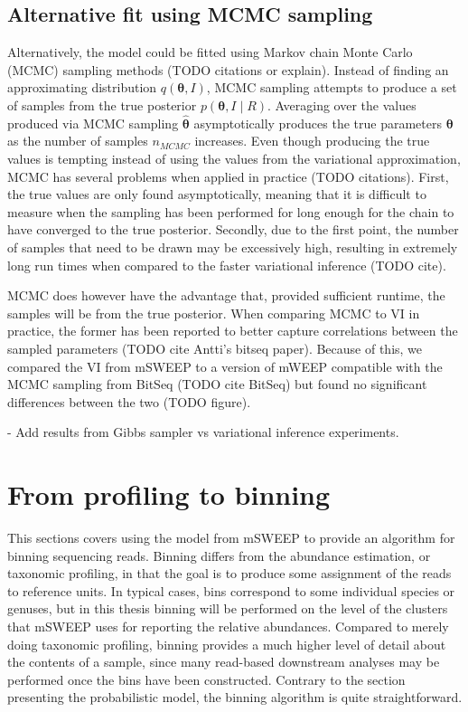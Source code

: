 \documentclass[officiallayout]{tktla}
\begin{document}
\subsection{Alternative fit using MCMC sampling}
Alternatively, the model could be fitted using Markov chain Monte
Carlo (MCMC) sampling methods (TODO citations or explain). Instead of
finding an approximating distribution $q\left(\boldsymbol\theta,
I\right)$, MCMC sampling attempts to produce a set of samples from the
true posterior $p\left(\boldsymbol\theta, I\middle|
R\right)$. Averaging over the values produced via MCMC sampling
$\hat{\boldsymbol\theta}$ asymptotically produces the true parameters
$\boldsymbol\theta$ as the number of samples $n_{MCMC}$
increases. Even though producing the true values is tempting instead
of using the values from the variational approximation, MCMC has
several problems when applied in practice (TODO citations). First, the
true values are only found asymptotically, meaning that it is
difficult to measure when the sampling has been performed for long
enough for the chain to have converged to the true
posterior. Secondly, due to the first point, the number of samples
that need to be drawn may be excessively high, resulting in extremely
long run times when compared to the faster variational inference (TODO
cite).

MCMC does however have the advantage that, provided sufficient
runtime, the samples will be from the true posterior. When comparing
MCMC to VI in practice, the former has been reported to better capture
correlations between the sampled parameters (TODO cite Antti's bitseq
paper). Because of this, we compared the VI from mSWEEP to a version
of mWEEP compatible with the MCMC sampling from BitSeq (TODO cite
BitSeq) but found no significant differences between the two (TODO figure).

- Add results from Gibbs sampler vs variational inference experiments.

\section{From profiling to binning}
\label{section:binning}

This sections covers using the model from mSWEEP to provide an
algorithm for binning sequencing reads. Binning differs from the
abundance estimation, or taxonomic profiling, in that the goal is to
produce some assignment of the reads to reference units. In typical
cases, bins correspond to some individual species or genuses, but in
this thesis binning will be performed on the level of the clusters
that mSWEEP uses for reporting the relative abundances. Compared to
merely doing taxonomic profiling, binning provides a much higher level
of detail about the contents of a sample, since many read-based
downstream analyses may be performed once the bins have been
constructed. Contrary to the section presenting the probabilistic
model, the binning algorithm is quite straightforward.
\end{document}
